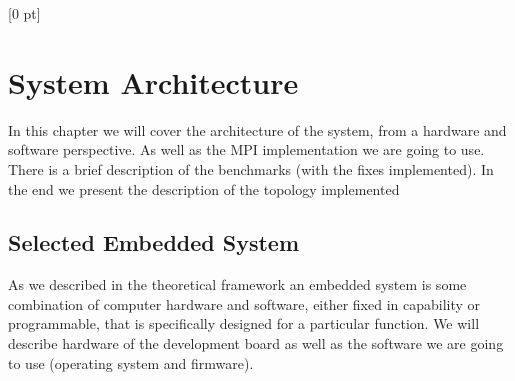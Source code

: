 \titlespacing{\chapter}{0 pt}{30 pt}{50 pt}[0 pt]
\titleformat{\section}{\Large\bfseries}{\thesection}{0 pt}{\hspace{30 pt}}
\titleformat{\subsection}{\large\bfseries}{\thesubsection}{0 pt}{\hspace{30 pt}}
\pagestyle{fancy}
\fancyhead[LO,LE]{\footnotesize\emph{\leftmark}}
\fancyhead[RO,RE]{\thepage}
\fancyfoot[CO,CE]{}

\chapter{System Architecture}

\normalsize
\noindent
In this chapter we will cover the architecture of the system, from a hardware
and software perspective. As well as the MPI implementation we are going to
use. There is a brief description of the benchmarks (with the fixes
implemented). In the end we present the description of the topology implemented

\section{Selected Embedded System}
\noindent

As we described in the theoretical framework an embedded system is some
combination of computer hardware and software, either fixed in capability or
programmable, that is specifically designed for a particular function. We will
describe hardware of the development board as well as the software we are going
to use (operating system and firmware).

